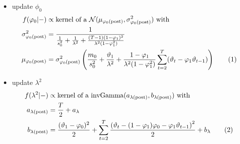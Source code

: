 \documentclass[12pt,	%
	a4paper,		%
	twoside,		%
	openright,		%
	titlepage,%
	]{book}
\newcommand\numberthis{\addtocounter{equation}{1}\tag{\theequation}}
\theoremstyle{definition}
\begin{document}
\begin{itemize}
\item update $\phi_0$
\begin{align*}
     f(\phi_0|-) &\propto \text{kernel of a $\N(\mu_{\phi_0\post},\sigma^{2}_{\phi_0\post})$ with}\\
    \sigma^{2}_{\postp{\phi_0}} &= \dfrac{1}{\frac{1}{s_0^2}+\frac{1}{\lambda^2}+\frac{(T-1)(1-\phi_1)^2}{\lambda^2(1-\phi_1^2)}}\\
    \mu_{\phi_0\post} &= \sigma^{2}_{\phi_0\post} \left(\dfrac{m_0}{s_0^2}+\dfrac{\theta_1}{\lambda^2}+\dfrac{1-\phi_1}{\lambda^2(1-\phi_1^2)}\sum_{t=2}^T(\theta_t-\phi_1\theta_{t-1})\right)
 \numberthis \label{update phi0}
\end{align*}

\item update $\lambda^2$
\begin{align*}
     f(\lambda^2|-)&\propto \text{kernel of a $\invgamma(a_{\postp{\lambda}}, b_{\postp{\lambda}})$ with}\\
a_{\postp{\lambda}}&=\frac{T}{2}+a_\lambda\\
%
b_{\postp{\lambda}}&=  \frac{(\theta_1-\phi_0)^2}{2}
 + \sum_{t=2}^T \frac{\left( \theta_t - (1-\phi_1)\phi_0 -\phi_1\theta_{t-1}\right)^2}{2}+b_\lambda
 \numberthis \label{update lambda2}
\end{align*}


\end{itemize}
\end{document}
